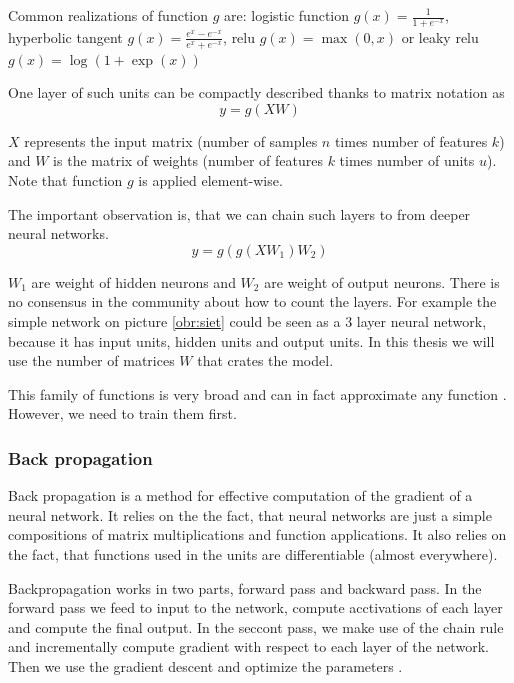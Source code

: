         Common realizations of function $g$ are: logistic function $g(x) = \frac{1}{1+e^{-x}}$, 
        hyperbolic tangent $g(x)=\frac{e^x-e^{-x}}{e^x+e^{-x}}$, relu $g(x) = \max(0,x)$ or leaky relu $g(x)=\log(1+\exp(x))$
        
        One layer of such units can be compactly described thanks to matrix notation as
        $$y=g(X W)$$
        
        $X$ represents the input matrix (number of samples $n$ times number of features $k$) and $W$ is the matrix of weights (number of features $k$ times number of units $u$). Note that function $g$ is applied element-wise.
        
        The important observation is, that we can chain such layers to from deeper neural networks.
        $$y=g(g(X W_1) W_2)$$
        
        $W_1$ are weight of hidden neurons and $W_2$ are weight of output neurons.
        There is no consensus in the community about how to count the layers. 
        For example the simple network on picture \ref{obr:siet} could be seen as a $3$ layer neural network,
        because it has input units, hidden units and output units.
        In this thesis we will use the number of matrices $W$ that crates the model.
        
        This family of functions is very broad and can in fact approximate any function \cite{cybenko1989approximation}.
        However, we need to train them first.
        
        \subsubsection{Back propagation}
        
        Back propagation is a method for effective computation of the gradient of a neural network.
        It relies on the the fact, that neural networks are just a simple compositions of matrix multiplications 
        and function applications. 
        It also relies on the fact, that functions used in the units are differentiable (almost everywhere).
        
        Backpropagation works in two parts, forward pass and backward pass.
        In the forward pass we feed to input to the network, compute acctivations of each layer and compute the final output.
        In the seccont pass, we make use of the chain rule and incrementally compute gradient with respect to each layer of the network.
        Then we use the gradient descent and optimize the parameters \cite{rumelhart1986david}.
        
